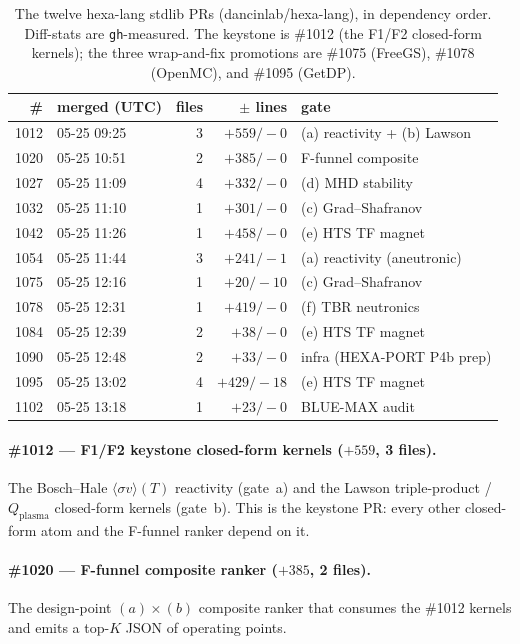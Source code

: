 \begin{table}[h]
\centering
\small
\begin{tabular}{rlrrl}
\toprule
\# & merged (UTC) & files & $\pm$ lines & gate \\
\midrule
1012 & 05-25 09:25 & 3 & $+559/-0$  & (a) reactivity + (b) Lawson \\
1020 & 05-25 10:51 & 2 & $+385/-0$  & F-funnel composite \\
1027 & 05-25 11:09 & 4 & $+332/-0$  & (d) MHD stability \\
1032 & 05-25 11:10 & 1 & $+301/-0$  & (c) Grad--Shafranov \\
1042 & 05-25 11:26 & 1 & $+458/-0$  & (e) HTS TF magnet \\
1054 & 05-25 11:44 & 3 & $+241/-1$  & (a) reactivity (aneutronic) \\
1075 & 05-25 12:16 & 1 & $+20/-10$  & (c) Grad--Shafranov \\
1078 & 05-25 12:31 & 1 & $+419/-0$  & (f) TBR neutronics \\
1084 & 05-25 12:39 & 2 & $+38/-0$   & (e) HTS TF magnet \\
1090 & 05-25 12:48 & 2 & $+33/-0$   & infra (HEXA-PORT P4b prep) \\
1095 & 05-25 13:02 & 4 & $+429/-18$ & (e) HTS TF magnet \\
1102 & 05-25 13:18 & 1 & $+23/-0$   & BLUE-MAX audit \\
\bottomrule
\end{tabular}
\caption{The twelve hexa-lang stdlib PRs (dancinlab/hexa-lang), in
dependency order. Diff-stats are \texttt{gh}-measured. The keystone is
\#1012 (the F1/F2 closed-form kernels); the three wrap-and-fix
promotions are \#1075 (FreeGS), \#1078 (OpenMC), and \#1095 (GetDP).}
\label{tab:app:prroll:hexalang}
\end{table}

\paragraph{\#1012 --- F1/F2 keystone closed-form kernels
($+559$, 3 files).}
The Bosch--Hale $\langle\sigma v\rangle(T)$ reactivity (gate~a) and the
Lawson triple-product / $Q_{\text{plasma}}$ closed-form kernels
(gate~b). This is the keystone PR: every other closed-form atom and the
F-funnel ranker depend on it.

\paragraph{\#1020 --- F-funnel composite ranker ($+385$, 2 files).}
The design-point $(a)\!\times\!(b)$ composite ranker that consumes the
\#1012 kernels and emits a top-$K$ JSON of operating points.


